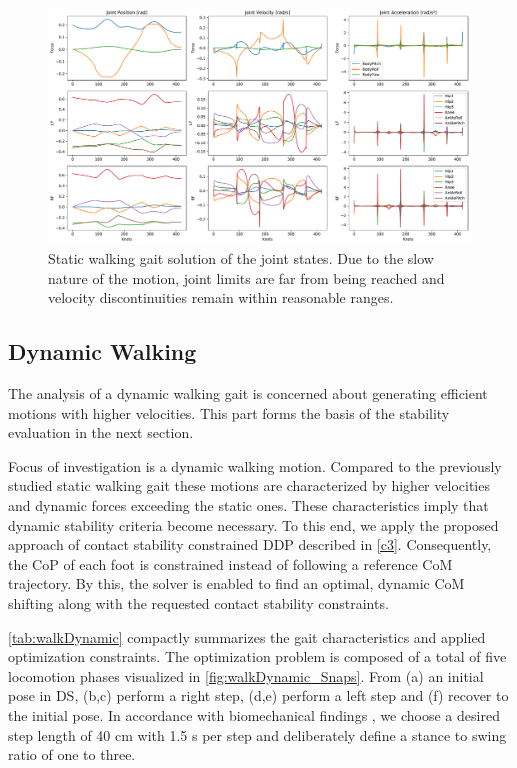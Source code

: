 \begin{figure}[h!]
\centering	
\includegraphics[width=1\textwidth]{fig/walkStatic/JointState}
\caption[Static walking gait solution of the joint states]{Static walking gait solution of the joint states. Due to the slow nature of the motion, joint limits are far from being reached and velocity discontinuities remain within reasonable ranges.}
\label{fig:walkStatic_JointState}
\end{figure} 

\subsection{Dynamic Walking}
The analysis of a dynamic walking gait is concerned about generating efficient motions with higher velocities. This part forms the basis of the stability evaluation in the next section.

Focus of investigation is a dynamic walking motion. Compared to the previously studied static walking gait these motions are characterized by higher velocities and dynamic forces exceeding the static ones. These characteristics imply that dynamic stability criteria become necessary. To this end, we apply the proposed approach of contact stability constrained DDP described in \cref{c3}. Consequently, the \gls{CoP} of each foot is constrained instead of following a reference \gls{CoM} trajectory. By this, the solver is enabled to find an optimal, dynamic \gls{CoM} shifting along with the requested contact stability constraints. 

\cref{tab:walkDynamic} compactly summarizes the gait characteristics and applied optimization constraints. The optimization problem is composed of a total of five locomotion phases visualized in \cref{fig:walkDynamic_Snaps}. From (a) an initial pose in \gls{DS}, (b,c) perform a right step, (d,e) perform a left step and (f) recover to the initial pose. In accordance with biomechanical findings \cite{kuo2001simple}, we choose a desired step length of 40 \nolinebreak cm with 1.5 s per step and deliberately define a stance to swing ratio of one to three.

